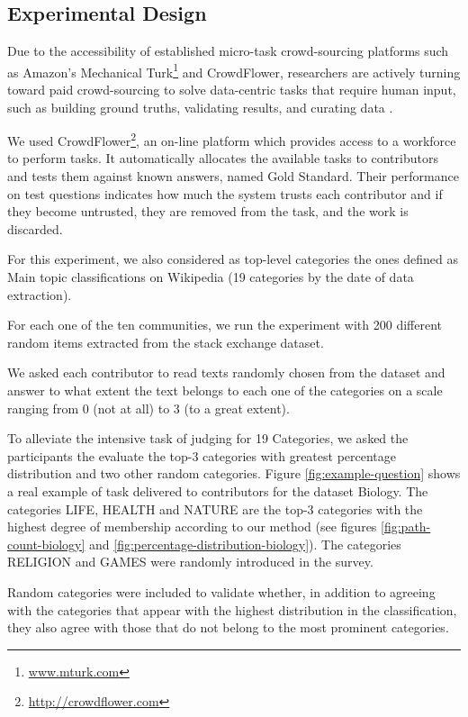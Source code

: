 \subsection{\hspace*{3pt} Experimental Design}

Due to the accessibility of established micro-task crowd-sourcing platforms such as Amazon’s Mechanical Turk\footnote{\url{www.mturk.com}} and CrowdFlower, researchers are actively turning toward paid crowd-sourcing to solve data-centric tasks that require human input, such as building ground truths, validating results, and curating data \cite{7156008}.

We used CrowdFlower\footnote{\url{http://crowdflower.com}}, an on-line platform which provides access to a workforce to perform tasks.  It automatically allocates the available tasks to contributors and tests them against known answers, named Gold Standard. Their performance on test questions indicates how much the system trusts each contributor and if they become untrusted, they are removed from the task, and the work is discarded.

For this experiment, we also considered as top-level categories the ones defined as Main topic classifications on Wikipedia (19 categories by the date of data extraction). 

For each one of the ten communities, we run the experiment with 200 different random items extracted from the stack exchange dataset. 

We asked each contributor to read texts randomly chosen from the dataset and answer to what extent the text belongs to each one of the categories on a scale ranging from 0 (not at all) to 3 (to a great extent). 

To alleviate the intensive task of judging for 19 Categories, we asked the participants the evaluate the top-3 categories with greatest percentage distribution and two other random categories.  Figure \ref{fig:example-question} shows a real example of task delivered to contributors for the dataset Biology. The categories LIFE, HEALTH and NATURE are the top-3 categories with the highest degree of membership according to our method (see figures \ref{fig:path-count-biology} and \ref{fig:percentage-distribution-biology}). The categories RELIGION and GAMES were randomly introduced in the survey. 

Random categories were included to validate whether, in addition to agreeing with the categories that appear with the highest distribution in the classification, they also agree with those that do not belong to the most prominent categories.  

